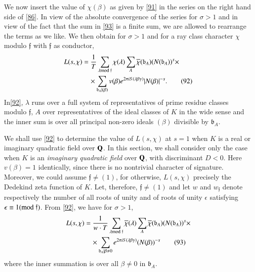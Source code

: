 We now insert the value of $\chi(\beta)$ as given by \eqref{91} in the
series on the right hand side of \eqref{86}. In view of the absolute
convergence of the series for $\sigma>1$ and in view of the fact that
the sum in \eqref{93} is a finite sum, we are allowed to rearrange the
terms as we like. We then obtain for $\sigma>1$ and for a ray class
character $\chi$ modulo $\mathfrak{f}$ with $\mathfrak{f}$ as
conductor,
\begin{align*}
L(s,\chi) &=
\frac{1}{T}\sum_{\lambda\rm{mod} \;\mathfrak{f}}\chi(\lambda)\sum_{A}\overline{\chi}(\mathfrak{b}_{A})(N(\mathfrak{b}_{A}))^{s}\times\\
&\quad \times\sum_{\mathfrak{b}_{A}|(\beta)}v(\beta)e^{2\pi
  iS(\lambda\beta\gamma)}|N(\beta)|^{-s}.\tag{92}\label{92} 
\end{align*}
In\pageoriginale \eqref{92}, $\lambda$ runs over a full system of
representatives of prime residue classes modulo $\mathfrak{f}$, $A$
over representatives of the ideal classes of $K$ in the wide sense and
the inner sum is over all principal non-zero ideals $(\beta)$
divisible by $\mathfrak{b}_{A}$.

We shall use \eqref{92} to determine the value of $L(s,\chi)$ at $s=1$
when $K$ is a real or imaginary quadratic field over $\mathbf{Q}$. In this
section, we shall consider only the case when $K$ is an {\em imaginary
  quadratic field} over $\mathbf{Q}$, with discriminant $D<0$. Here
$v(\beta)=1$ identically, since there is no nontrivial character of
signature. Moreover, we could assume $\mathfrak{f}\neq (1)$, for
otherwise, $L(s,\chi)$ precisely the Dedekind zeta function of
$K$. Let, therefore, $\mathfrak{f}\neq (1)$ and let $w$ and
$w_{\mathfrak{f}}$ denote respectively the number of all roots of
unity and of roots of unity $\epsilon$ satisfying $\epsilon\equiv
1(\rm{mod} \;\mathfrak{f})$. From \eqref{92}, we have for $\sigma>1$,
\begin{align*}
L(s,\chi) &= \frac{1}{w\cdot
  T}\sum_{\lambda\rm{mod} \;\mathfrak{f}}\overline{\chi}(\lambda)\sum_{A}\overline{\chi}(\mathfrak{b}_{A})(N(\mathfrak{b}_{A}))^{s}\times\\
&\quad \times\sum_{\mathfrak{b}_{A}|\beta\neq 0}e^{2\pi
  iS(\lambda\beta\gamma)}(N(\beta))^{-s}\tag{93}\label{93} 
\end{align*}
where the inner summation is over all $\beta\neq 0$ in
$\mathfrak{b}_{A}$.

